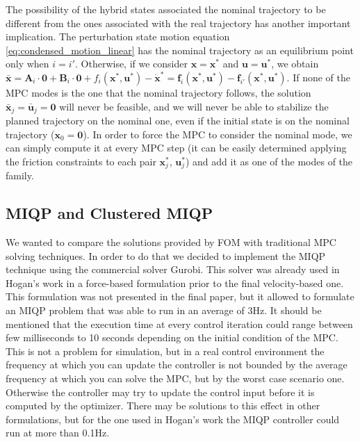 \documentclass[12,twoside]{TFG-GM}
\theoremstyle{definition}
\theoremstyle{remark}
\newcommand*\diff[1]{\bar{#1}}
\begin{document}
The possibility of the hybrid states associated the nominal trajectory to be different from the ones associated with the real trajectory has another important implication. The perturbation state motion equation \ref{eq:condensed_motion_linear} has the nominal trajectory as an equilibrium point only when $i = i'$. Otherwise, if we consider $\textbf{x} = \textbf{x}^*$ and $\textbf{u} = \textbf{u}^*$, we obtain $\diff{\textbf{x}} = \textbf{A}_i \cdot \textbf{0} + \textbf{B}_i \cdot \textbf{0} + f_i(\textbf{x}^*, \textbf{u}^*) - \dot{\textbf{x}}^* = \textbf{f}_i(\textbf{x}^*, \textbf{u}^*) - \textbf{f}_{i'}(\textbf{x}^*, \textbf{u}^*)$. If none of the MPC modes is the one that the nominal trajectory follows, the solution $\diff{\textbf{x}}_j = \diff{\textbf{u}}_j = \textbf{0}$ will never be feasible, and we will never be able to stabilize the planned trajectory on the nominal one, even if the initial state is on the nominal trajectory ($\textbf{x}_0 = \textbf{0}$). In order to force the MPC to consider the nominal mode, we can simply compute it at every MPC step (it can be easily determined applying the friction constraints to each pair $\textbf{x}_j^*$, $\textbf{u}_j^*$) and add it as one of the modes of the family.

\subsection{MIQP and Clustered MIQP}
\label{subsec:miqp}

We wanted to compare the solutions provided by FOM with traditional MPC solving techniques. In order to do that we decided to implement the MIQP technique using the commercial solver Gurobi. This solver was already used in Hogan's work in a force-based formulation prior to the final velocity-based one. This formulation was not presented in the final paper, but it allowed to formulate an MIQP problem that was able to run in an average of 3Hz. It should be mentioned that the execution time at every control iteration could range between few milliseconds to 10 seconds depending on the initial condition of the MPC.
This is not a problem for simulation, but in a real control environment the frequency at which you can update the controller is not bounded by the average frequency at which you can solve the MPC, but by the worst case scenario one. Otherwise the controller may try to update the control input before it is computed by the optimizer. There may be solutions to this effect in other formulations, but for the one used in Hogan's work the MIQP controller could run at more than 0.1Hz.
\end{document}
